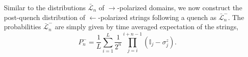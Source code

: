 \documentclass[aps,prx,twocolumn]{revtex4-2}
\begin{document}
%
Similar to the distributions $\bar{\mathcal{L}}_n$ of $\rightarrow$-polarized domains, we now construct the post-quench distribution of $\leftarrow$-polarized strings following a quench as $\bar{\mathcal{L}}_n^-$. The probabilities $\bar{\mathcal{L}}_n^-$ are simply given by time averaged expectation of the strings,
\begin{equation}
	P_n^-=\frac{1}{L}\sum\limits_{i=1}^{L}\frac{1}{2^n}\prod\limits_{j=i}^{i+n-1}\left(\mathbb{I}_j-\sigma_j^z\right).
\end{equation}
\end{document}
